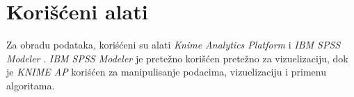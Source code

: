 \section{Kori\v{s}\'c{}eni alati}
\label{sec:Alati}

Za obradu podataka, kori\'s{}\'c{}eni su alati \emph{Knime Analytics Platform} \cite{KNIME} i \emph{IBM SPSS Modeler} \cite{SPSS}. \emph{IBM SPSS Modeler} je prete\v{z}no kori\v{s}\'c{}en prete\v{z}no za vizuelizaciju, dok je \emph{KNIME AP} kori\'s{}\'c{}en za manipulisanje podacima, vizuelizaciju i primenu algoritama.
